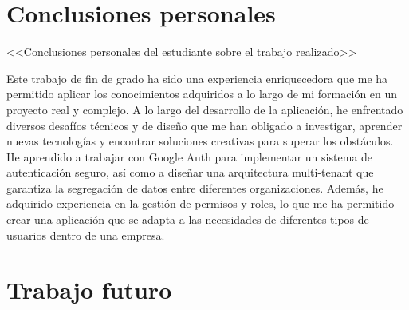
\section{Conclusiones personales} \label{sct:resultados_conclusiones}

<<Conclusiones personales del estudiante sobre el trabajo realizado>>

Este trabajo de fin de grado ha sido una experiencia enriquecedora que me ha permitido aplicar los conocimientos adquiridos a lo largo de mi formación en un proyecto real y complejo. A lo largo del desarrollo de la aplicación, he enfrentado diversos desafíos técnicos y de diseño que me han obligado a investigar, aprender nuevas tecnologías y encontrar soluciones creativas para superar los obstáculos. He aprendido a trabajar con Google Auth para implementar un sistema de autenticación seguro, así como a diseñar una arquitectura multi-tenant que garantiza la segregación de datos entre diferentes organizaciones. Además, he adquirido experiencia en la gestión de permisos y roles, lo que me ha permitido crear una aplicación que se adapta a las necesidades de diferentes tipos de usuarios dentro de una empresa.


\section{Trabajo futuro} \label{sct:resultados_trabajofuturo}

